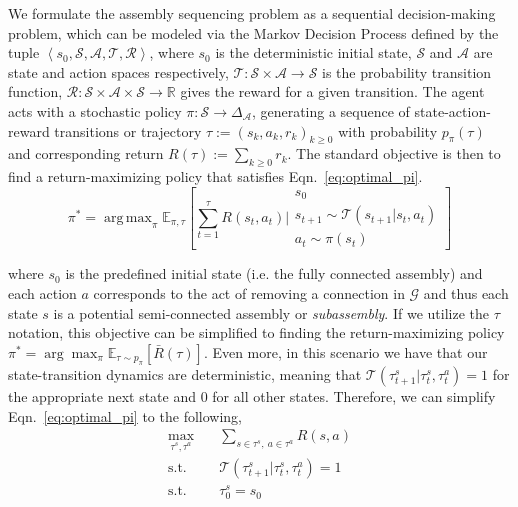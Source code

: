 \documentclass{article}
\DeclareMathOperator*{\argmax}{arg\,max}
\begin{document}
We formulate the assembly sequencing problem as a sequential decision-making problem, which can be modeled via the Markov Decision Process defined by the tuple $\left\langle s_0, \mathcal{S}, \mathcal{A}, \mathcal{T}, \mathcal{R}\right\rangle$, where $s_0$ is the deterministic initial state, $\mathcal{S}$ and $\mathcal{A}$ are state and action spaces respectively, $\mathcal{T}: \mathcal{S} \times \mathcal{A} \rightarrow \mathcal{S}$ is the probability transition function, $\mathcal{R}: \mathcal{S} \times \mathcal{A} \times \mathcal{S} \rightarrow \mathbb{R}$ gives the reward for a given transition. The agent acts with a stochastic policy $\pi: \mathcal{S} \rightarrow \Delta_{\mathcal{A}}$, generating a sequence of state-action-reward transitions or trajectory $\tau:=\left(s_k, a_k, r_k\right)_{k \geq 0}$ with probability $p_\pi(\tau)$ and corresponding return $R(\tau):=\sum_{k \geq 0}  r_k$. The standard objective is then to find a return-maximizing policy that satisfies Eqn.~\ref{eq:optimal_pi}.
\begin{equation} \label{eq:optimal_pi}
    \pi^* = \argmax_{\pi} \mathbb{E}_{\pi, \tau}\left [\sum_{t=1}^{\tau} R(s_t,a_t) \bigg| 
    \begin{array}{c}
        s_0\\
        s_{t+1}\sim \mathcal{T}(s_{t+1} | s_t, a_t)\\
        a_t\sim \pi(s_t)
    \end{array}
    \right ]
\end{equation}

where $s_0$ is the predefined initial state (i.e. the fully connected assembly) and each action $a$ corresponds to the act of removing a connection in $\mathcal{G}$ and thus each state $s$ is a potential semi-connected assembly or \emph{subassembly}. If we utilize the $\tau$ notation, this objective can be simplified to finding the return-maximizing policy $\pi^*=\arg \max _\pi \mathbb{E}_{\tau \sim p_\pi}[\bar{R}(\tau)]$. Even more, in this scenario we have that our state-transition dynamics are deterministic, meaning that $\mathcal{T}(\tau^{s}_{t+1}|\tau^s_t,\tau^a_t) = 1$ for the appropriate next state and $0$ for all other states. Therefore, we can simplify Eqn.~\ref{eq:optimal_pi} to the following,
\begin{equation} \label{eq:optimization}
    \begin{aligned} 
        \max_{\tau^s, \tau^a} \quad & \sum_{s\in \tau^s,\ a \in \tau^a}{R(s,a)}\\
        \textrm{s.t.} \quad & \mathcal{T}(\tau^{s}_{t+1}|\tau^s_t,\tau^a_t) = 1\\
        \textrm{s.t.} \quad & \tau^s_0 = s_0
    \end{aligned}
\end{equation}
\end{document}
